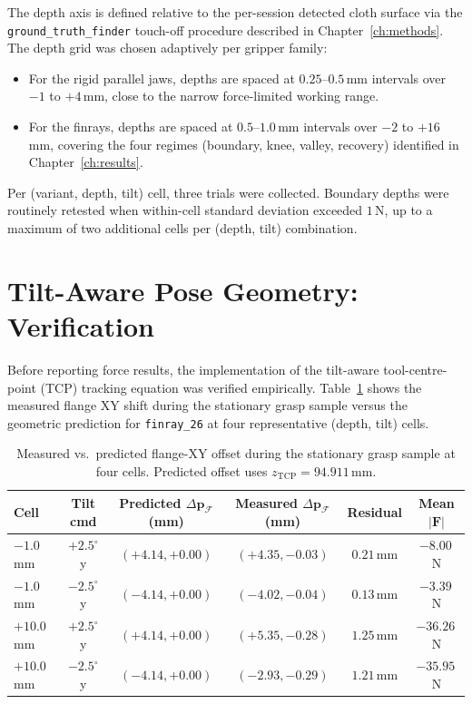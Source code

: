 The depth axis is defined relative to the per-session detected cloth
surface via the \texttt{ground\_truth\_finder} touch-off procedure
described in Chapter~\ref{ch:methods}. The depth grid was chosen
adaptively per gripper family:
\begin{itemize}
  \item For the rigid parallel jaws, depths are spaced at $0.25$--$0.5$\,mm
        intervals over $-1$ to $+4$\,mm, close to the narrow
        force-limited working range.
  \item For the finrays, depths are spaced at $0.5$--$1.0$\,mm intervals
        over $-2$ to $+16$\,mm, covering the four regimes
        (boundary, knee, valley, recovery) identified in
        Chapter~\ref{ch:results}.
\end{itemize}

Per (variant, depth, tilt) cell, three trials were collected. Boundary
depths were routinely retested when within-cell standard deviation
exceeded $1$\,N, up to a maximum of two additional cells per
(depth, tilt) combination.

\section{Tilt-Aware Pose Geometry: Verification}
\label{sec:tilt-verify}

Before reporting force results, the implementation of the tilt-aware
tool-centre-point (TCP) tracking equation was verified empirically.
Table~\ref{tab:tilt-geometry} shows the measured flange XY shift during
the stationary grasp sample versus the geometric prediction for
\texttt{finray\_26} at four representative (depth, tilt) cells.

\begin{table}[ht]
\centering
\caption[Tilt geometry verification]{Measured vs.~predicted flange-XY
offset during the stationary grasp sample at four cells. Predicted
offset uses $z_{\text{TCP}} = 94.911$\,mm.}
\label{tab:tilt-geometry}
\small
\begin{tabular}{lccccc}
\toprule
Cell & Tilt cmd & Predicted $\Delta \mathbf{p}_\mathcal{F}$ (mm) &
       Measured $\Delta \mathbf{p}_\mathcal{F}$ (mm) & Residual & Mean $|\mathbf{F}|$ \\
\midrule
$-1.0$\,mm   & $+2.5^{\circ}$ y & $(+4.14, +0.00)$ & $(+4.35, -0.03)$ & $0.21$\,mm & $-8.00$\,N \\
$-1.0$\,mm   & $-2.5^{\circ}$ y & $(-4.14, +0.00)$ & $(-4.02, -0.04)$ & $0.13$\,mm & $-3.39$\,N \\
$+10.0$\,mm  & $+2.5^{\circ}$ y & $(+4.14, +0.00)$ & $(+5.35, -0.28)$ & $1.25$\,mm & $-36.26$\,N \\
$+10.0$\,mm  & $-2.5^{\circ}$ y & $(-4.14, +0.00)$ & $(-2.93, -0.29)$ & $1.21$\,mm & $-35.95$\,N \\
\bottomrule
\end{tabular}
\end{table}

